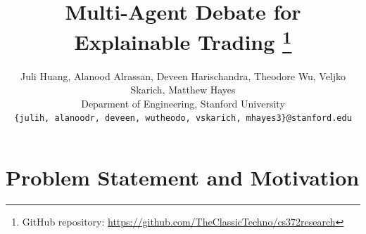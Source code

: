 \documentclass{article}
\title{Multi-Agent Debate for Explainable Trading
\thanks{GitHub repository: \url{https://github.com/TheClassicTechno/cs372research}}}
\author{
\hspace{-2.5em}
  Juli Huang, Alanood Alrassan, 
  Deveen Harischandra, Theodore Wu, Veljko Skarich, Matthew Hayes \\
  Deparment of Engineering, Stanford University \\
  \texttt{\{julih, alanoodr, deveen, wutheodo, vskarich, mhayes3\}@stanford.edu}
}
\begin{document}
\maketitle
\vspace{-20pt}
\section{Problem Statement and Motivation}
\vspace{-8pt}



\end{document}
